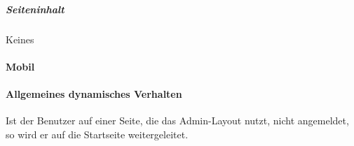 \subparagraph*{Seiteninhalt}
Keines

\paragraph*{Mobil}

\paragraph*{Allgemeines dynamisches Verhalten}
Ist der Benutzer auf einer Seite, die das Admin-Layout nutzt, nicht angemeldet, so wird er auf die Startseite weitergeleitet.
